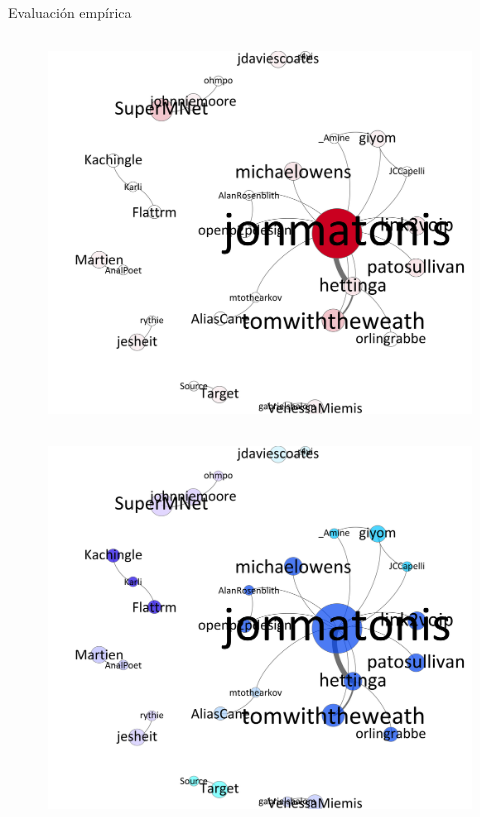 \begin{frame}[t]
\begin{block}{Evaluación empírica}
\begin{minipage}[t][.40\textheight][t]{\textwidth}
\begin{column}{0.3\textwidth}
    \tiny
    \begin{figure}[H]
        \begin{center}
             \includegraphics[width=1\textwidth]{images/C3/c3_red_influ_real_2010.pdf}
         \end{center}
    \end{figure}
\end{column}
\begin{column}{0.3\textwidth}  
    \tiny
    \begin{figure}[H]
        \begin{center}
         \includegraphics[width=1\textwidth]{images/C3/c3_red_com_real_2010.pdf}

\end{center}
\end{figure}
\end{column}
\end{minipage}
\end{block}
\end{frame}
